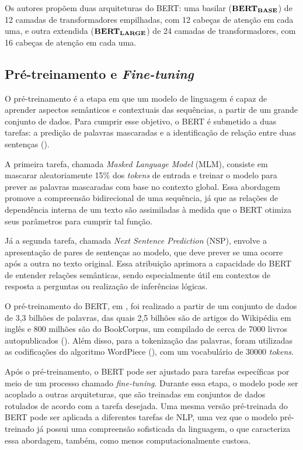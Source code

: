 Os autores \citet{bert2018} propõem duas arquiteturas do BERT: uma basilar ($\text{\textbf{BERT}}_{\text{\textbf{BASE}}}$) de 12 camadas de transformadores empilhadas, com 12 cabeças de atenção em cada uma, e outra extendida ($\text{\textbf{BERT}}_{\text{\textbf{LARGE}}}$) de 24 camadas de transformadores, com 16 cabeças de atenção em cada uma.


\subsection{Pré-treinamento e \textit{Fine-tuning}}

O pré-treinamento é a etapa em que um modelo de linguagem é capaz de aprender aspectos semânticos e contextuais das sequências, a partir de um grande conjunto de dados. Para cumprir esse objetivo, o BERT é submetido a duas tarefas: a predição de palavras mascaradas e a identificação de relação entre duas sentenças (\cite{zhang2023dive}).

A primeira tarefa, chamada \textit{Masked Language Model} (MLM), consiste em mascarar aleatoriamente 15\% dos \textit{tokens} de entrada e treinar o modelo para prever as palavras mascaradas com base no contexto global.  Essa abordagem promove a compreensão bidirecional de uma sequência, já que as relações de dependência interna de um texto são assimiladas à medida que o BERT otimiza seus parâmetros para cumprir tal função.

Já a segunda tarefa, chamada \textit{Next Sentence Prediction} (NSP), envolve a apresentação de pares de sentenças ao modelo, que deve prever se uma ocorre após a outra no texto original. Essa atribuição aprimora a capacidade do BERT de entender relações semânticas, sendo especialmente útil em contextos de resposta a perguntas ou realização de inferências lógicas.

O pré-treinamento do BERT, em \cite{bert2018}, foi realizado a partir de um conjunto de dados de 3,3 bilhões de palavras, das quais 2,5 bilhões são de artigos do Wikipédia em inglês e 800 milhões são do BookCorpus, um compilado de cerca de 7000 livros autopublicados (\cite{zhu2015aligning}). Além disso, para a tokenização das palavras, foram utilizadas as codificações do algoritmo WordPiece (\cite{wu2016googles}), com um vocabulário de 30000 \textit{tokens}.

Após o pré-treinamento, o BERT pode ser ajustado para tarefas específicas por meio de um processo chamado \textit{fine-tuning}. Durante essa etapa, o modelo pode ser acoplado a outras arquiteturas, que são treinadas em conjuntos de dados rotulados de acordo com a tarefa desejada. Uma mesma versão pré-treinada do BERT pode ser aplicada a diferentes tarefas de NLP, uma vez que o modelo pré-treinado já possui uma compreensão sofisticada da linguagem, o que caracteriza essa abordagem, também, como menos computacionalmente custosa.


